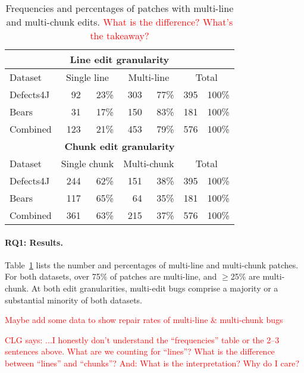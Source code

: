 \documentclass[sigconf, timestamp-false, anonymous=true]{acmart}
\newcommand\todo[1]{\textcolor{red}{#1}}
\begin{document}
\begin{table}
{\begin{center}
	\begin{tabular}{l | rr | rr | rr}
		\toprule
		\multicolumn{7}{c}{\textbf{Line edit granularity}} \\
		\midrule
		Dataset & \multicolumn{2}{c}{Single line} & \multicolumn{2}{c}{Multi-line} & \multicolumn{2}{c}{Total} \\
		\midrule
		Defects4J & 92 & 23\% & 303 & 77\% & 395 & 100\%\\ %
		Bears & 31 & 17\% & 150 & 83\% & 181 & 100\%\\ %
		Combined & 123 & 21\% & 453 & 79\% & 576 & 100\% \\ %
		\midrule
		\multicolumn{7}{c}{\textbf{Chunk edit granularity}} \\
		\midrule
		Dataset & \multicolumn{2}{c}{Single chunk} & \multicolumn{2}{c}{Multi-chunk} & \multicolumn{2}{c}{Total} \\
		\midrule
		Defects4J & 244 & 62\% & 151 & 38\% & 395 & 100\%\\
		Bears & 117 & 65\% & 64 & 35\% & 181 & 100\%\\
		Combined & 361 & 63\% & 215 & 37\% & 576 & 100\%\\
		\bottomrule
	\end{tabular}
 \end{center}
}
	\caption{Frequencies and percentages of patches with multi-line and
          multi-chunk edits. \todo{What is the difference? What's the takeaway?}}
	\label{tab:multiedit-frequencies}
\end{table}

\paragraph{RQ1: Results.} 
Table~\ref{tab:multiedit-frequencies} lists the number and percentages of
multi-line and multi-chunk patches. For both datasets, over 75\% of patches are multi-line, 
and $\geq$25\% are multi-chunk. At both edit granularities, multi-edit bugs 
comprise a majority or a substantial minority of both datasets.

\todo{Maybe add some data to show repair rates of multi-line \& multi-chunk bugs}

\todo{CLG says: ...I honestly don't understand the ``frequencies'' table or the
  2--3 sentences above. What are we counting for ``lines''? What is the
  difference between ``lines'' and ``chunks''? And: What is the interpretation?
  Why do I care?}
\end{document}
